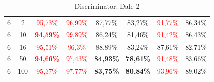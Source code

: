 \begin{table}[ht]
\begin{tabular}{cc|c|c|c|c|c|c}
        {6} & {2}   & \textcolor{red}{95,73\%}          & \textcolor{red}{96,99\%}          & {87,77\%}                & {83,27\%}                & \textcolor{red}{91,77\%} & {86,34\%}                \\
        {6} & {10}  & \textcolor{red}{\textbf{94,59\%}} & \textcolor{red}{99,89\%}          & {86,24\%}                & {81,46\%}                & \textcolor{red}{91,42\%} & {86,43\%}                \\
        {6} & {16}  & \textcolor{red}{95,51\%}          & \textcolor{red}{96,3\%}           & {88,89\%}                & {83,24\%}                & {87,61\%}                & {82,71\%}                \\
        {6} & {50}  & \textcolor{red}{\textbf{94,66\%}} & \textcolor{red}{97,43\%}          & \textbf{84,93\%}         & \textbf{78,61\%}         & \textcolor{red}{91,48\%} & {83,66\%}                \\
        {6} & {100} & \textcolor{red}{95,37\%}          & \textcolor{red}{97,77\%}          & \textbf{83,75\%}         & \textbf{80,84\%}         & \textcolor{red}{93,96\%} & {89,02\%}                \\
        \bottomrule
    \end{tabular}
    \caption{Discriminator: Dale-2}
    \label{tab:probing:discriminator:dale-2}
\end{table}

